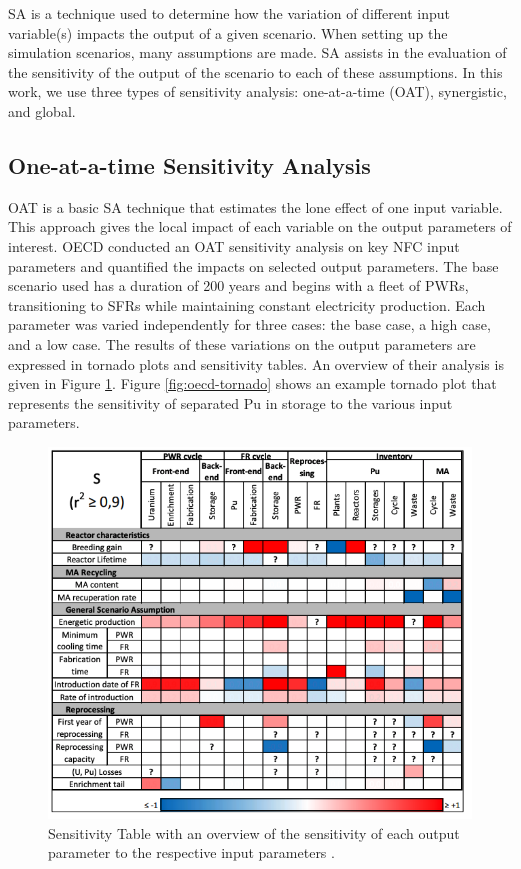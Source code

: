 \gls{SA} is a technique used to determine how the variation of 
different input variable(s) impacts the output of a given 
scenario. 
When setting up the simulation scenarios, many assumptions are made. 
\gls{SA} assists in the evaluation of the sensitivity of the 
output of the scenario to each of these assumptions. 
In this work, we use three types of sensitivity analysis: 
one-at-a-time (OAT), synergistic, and global.

\subsection{One-at-a-time Sensitivity Analysis}
OAT is a basic \gls{SA} technique that estimates 
the lone effect of one input variable. 
This approach gives the local impact of each variable on the 
output parameters of interest. 
OECD conducted an OAT sensitivity analysis \cite{noauthor_effects_2017} 
on key \gls{NFC} input parameters
and quantified the impacts on selected output parameters. 
The base scenario used has a duration of 200 years and begins 
with a fleet of \glspl{PWR}, transitioning to \glspl{SFR} while 
maintaining constant electricity production. 
Each parameter was varied independently for three cases: 
the base case, a high case, and a low case. 
The results of these variations on the output parameters 
are expressed in tornado plots and sensitivity tables. 
An overview of their analysis is given in 
Figure \ref{fig:oecd-sensitivitytable}. 
Figure \ref{fig:oecd-tornado} shows an example tornado plot that represents 
the sensitivity of separated Pu in storage to the various input parameters. 

\begin{figure}[]
	\begin{center}
		\includegraphics[scale=0.55]{./figures/oecd-sensitivitytable.png}
	\end{center}	
		\caption{Sensitivity Table with an overview of the sensitivity 
		of each output parameter to the respective input parameters \cite{noauthor_effects_2017}.}
	\label{fig:oecd-sensitivitytable}
\end{figure}

